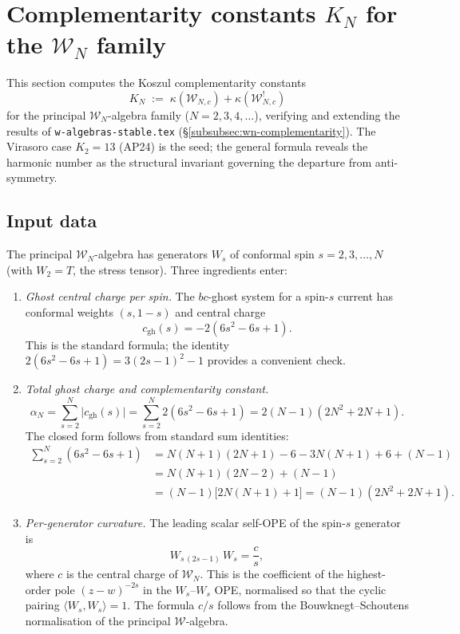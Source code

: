 \documentclass[11pt]{article}
\newcommand{\cW}{\mathcal{W}}
\begin{document}
\section{Complementarity constants $K_N$ for the $\cW_N$ family}
\label{sec:wn-complementarity-constants}

\noindent
This section computes the Koszul complementarity constants
\[
K_N \;:=\; \kappa(\cW_{N,c}) + \kappa(\cW_{N,c}^!)
\]
for the principal $\cW_N$-algebra family ($N = 2, 3, 4, \ldots$),
verifying and extending the results of
\texttt{w-algebras-stable.tex} (\S\ref{subsubsec:wn-complementarity}).
The Virasoro case $K_2 = 13$ (AP24) is the seed; the general formula
reveals the harmonic number as the structural invariant governing
the departure from anti-symmetry.

\subsection*{Input data}

The principal $\cW_N$-algebra has generators
$W_s$ of conformal spin $s = 2, 3, \ldots, N$ (with $W_2 = T$,
the stress tensor).  Three ingredients enter:

\begin{enumerate}[label=(\arabic*)]
\item \emph{Ghost central charge per spin.}
  The $bc$-ghost system for a spin-$s$ current has conformal
  weights $(s, 1-s)$ and central charge
  \[
  c_{\mathrm{gh}}(s) = -2(6s^2 - 6s + 1).
  \]
  This is the standard formula; the identity
  $2(6s^2 - 6s + 1) = 3(2s-1)^2 - 1$ provides a convenient check.

\item \emph{Total ghost charge and complementarity constant.}
  \[
  \alpha_N
  = \sum_{s=2}^{N} \bigl|c_{\mathrm{gh}}(s)\bigr|
  = \sum_{s=2}^{N} 2(6s^2 - 6s + 1)
  = 2(N-1)(2N^2 + 2N + 1).
  \]
  The closed form follows from standard sum identities:
  \begin{align*}
  \sum_{s=2}^{N}(6s^2 - 6s + 1)
  &= N(N+1)(2N+1) - 6 - 3N(N+1) + 6 + (N-1) \\
  &= N(N+1)(2N-2) + (N-1) \\
  &= (N-1)\bigl[2N(N+1) + 1\bigr]
  = (N-1)(2N^2 + 2N + 1).
  \end{align*}

\item \emph{Per-generator curvature.}
  The leading scalar self-OPE of the spin-$s$ generator is
  \[
  W_{s\,(2s-1)}\,W_s = \frac{c}{s},
  \]
  where $c$ is the central charge of $\cW_N$.  This is the
  coefficient of the highest-order pole $(z-w)^{-2s}$ in the
  $W_s$--$W_s$ OPE, normalised so that the cyclic pairing
  $\langle W_s, W_s \rangle = 1$.  The formula $c/s$ follows from
  the Bouwknegt--Schoutens normalisation of the principal
  $\cW$-algebra.
\end{enumerate}
\end{document}
